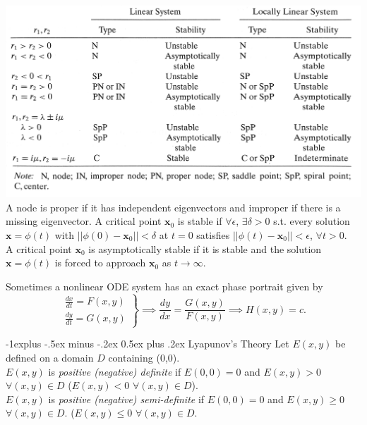\documentclass[10pt,landscape]{article}
\makeatletter
\renewcommand{\subsection}{\@startsection{subsection}{2}{0mm}%
                                {-1explus -.5ex minus -.2ex}%
                                {0.5ex plus .2ex}%
                                {\normalfont\normalsize\bfseries}}
\newcommand{\mbf}{\mathbf}
\newcommand{\f}{\frac}
\makeatother
\begin{document}
\begin{multicols}{3}
 	\includegraphics[width=1.0\columnwidth]{table}
 	A node is proper if it has independent eigenvectors and improper if there is a missing eigenvector.
	 A critical point $\mbf{x}_0$ is stable if $\forall \epsilon$, $\exists \delta>0$ s.t. every solution $\mbf{x} = \phi(t)$ with $||\phi(0)-\mbf{x}_0|| < \delta$ at $t=0$ satisfies $||\phi(t)-\mbf{x}_0|| < \epsilon$, $\forall t >0$.\\
	 A critical point $\mbf{x}_0$ is asymptotically stable if it is stable and the solution $\mbf{x} = \phi(t)$ is forced to approach $\mbf{x}_0$ as $t \rightarrow \infty$.
 
	Sometimes a nonlinear ODE system has an exact phase portrait given by 
 	\vspace{-0.2cm}
  	$$ \left. \begin{array}{ll}
		\f{dx}{dt} = F(x,y) \\ \f{dy}{dt} = G(x,y)
                \end{array}
              \right\} \implies \f{dy}{dx} = \f{G(x,y)}{F(x,y)} \implies H(x,y) = c. $$
  
  %
  
  	\subsection{Lyapunov's Theory}
	 Let $E(x,y)$ be defined on a domain $D$ containing (0,0). \\
 	$ E(x,y)$ is \emph{positive (negative) definite} if  $ E(0,0) = 0$ and  $ E(x,y) >0$ $\forall(x,y)\in D$ ($ E(x,y) < 0$ $\forall(x,y)\in D$). \\
  	$ E(x,y)$ is \emph{positive (negative) semi-definite} if  $ E(0,0) = 0$ and  $ E(x,y) \geq 0$ $\forall(x,y)\in D$. ($ E(x,y) \leq 0$ $\forall(x,y)\in D$.  \\
	

\end{multicols}
\end{document}
